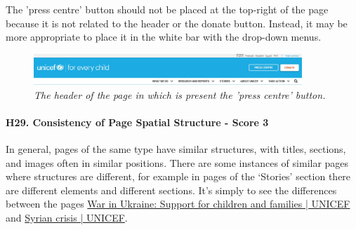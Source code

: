 \newline The 'press centre' button should not be placed at the top-right of the page because it is not related to the header or the donate button. Instead, it may be more appropriate to place it in the white bar with the drop-down menus.
\begin{figure}[h]
	\begin{center}
		\includegraphics[width=0.9\textwidth]{FinalScores32.jpg}
		\captionsetup{font=small}
		\caption{\textit{The header of the page in which is present the 'press centre' button.}}
	\end{center}
\end{figure}
\newline
\newline \paragraph{H29. Consistency of Page Spatial Structure - Score 3} \label{subsec:H29}	In general, pages of the same type have similar structures, with titles, sections, and images often in similar positions. There are some instances of similar pages where structures are different, for example in pages of the ‘Stories’ section there are different elements and different sections.
\newline It’s simply to see the differences between the pages \href{https://www.unicef.org/emergencies/war-ukraine-pose-immediate-threat-children}{War in Ukraine: Support for children and families | UNICEF} and \href{https://www.unicef.org/emergencies/syrian-crisis}{Syrian crisis | UNICEF}.




















